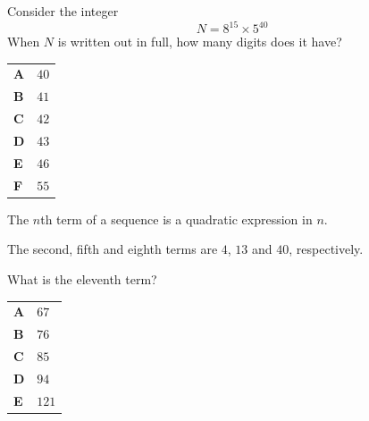\documentclass[11pt,a4paper]{article}
\begin{document}
\clearpage
\thispagestyle{djspaper}
\vspace*{8pt}
\begin{enumerate}[label=\textbf{\arabic*.},leftmargin=*,itemsep=0pt,start=7]
\questionitem[Number]
Consider the integer
\[N = 8^{15}\times 5^{40}\]
When $N$ is written out in full, how many digits does it have?

\par\vspace*{12pt}
\begin{tabularx}{\linewidth}{@{}>{\bfseries}l Y@{}}
A &
$40$
\\[0.8em]
B &
$41$
\\[0.8em]
C &
$42$
\\[0.8em]
D &
$43$
\\[0.8em]
E &
$46$
\\[0.8em]
F &
$55$
\\
\end{tabularx}
\end{enumerate}
\clearpage
\thispagestyle{djspaper}
\vspace*{8pt}
\begin{enumerate}[label=\textbf{\arabic*.},leftmargin=*,itemsep=0pt,start=8]
The $n$th term of a sequence is a quadratic expression in $n$. 

The second, fifth and eighth terms are $4$, $13$ and $40$, respectively. 

What is the eleventh term?

\par\vspace*{12pt}
\begin{tabularx}{\linewidth}{@{}>{\bfseries}l Y@{}}
A &
$67$
\\[0.8em]
B &
$76$
\\[0.8em]
C &
$85$
\\[0.8em]
D &
$94$
\\[0.8em]
E &
$121$
\\
\end{tabularx}
\end{enumerate}
\end{document}
